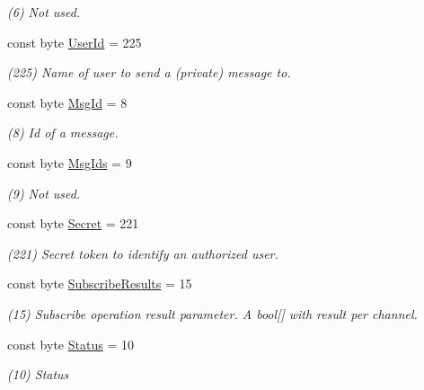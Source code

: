 \begin{DoxyCompactItemize}
\begin{DoxyCompactList}\small\item\em (6) Not used.\end{DoxyCompactList}\item 
const byte \hyperlink{class_exit_games_1_1_client_1_1_photon_1_1_chat_1_1_chat_parameter_code_a4725b80416516202851fced3224ddf10}{User\+Id} = 225
\begin{DoxyCompactList}\small\item\em (225) Name of user to send a (private) message to.\end{DoxyCompactList}\item 
const byte \hyperlink{class_exit_games_1_1_client_1_1_photon_1_1_chat_1_1_chat_parameter_code_a0a54ebe20f51af2268716891be3d6570}{Msg\+Id} = 8
\begin{DoxyCompactList}\small\item\em (8) Id of a message.\end{DoxyCompactList}\item 
const byte \hyperlink{class_exit_games_1_1_client_1_1_photon_1_1_chat_1_1_chat_parameter_code_abc7e73d686ae0713e349611c6ddd7a8e}{Msg\+Ids} = 9
\begin{DoxyCompactList}\small\item\em (9) Not used.\end{DoxyCompactList}\item 
const byte \hyperlink{class_exit_games_1_1_client_1_1_photon_1_1_chat_1_1_chat_parameter_code_aaaeab778bcf9ca4da5add8112086e360}{Secret} = 221
\begin{DoxyCompactList}\small\item\em (221) Secret token to identify an authorized user.\end{DoxyCompactList}\item 
const byte \hyperlink{class_exit_games_1_1_client_1_1_photon_1_1_chat_1_1_chat_parameter_code_a4991d2c2c138a78d8c95be54d1c805da}{Subscribe\+Results} = 15
\begin{DoxyCompactList}\small\item\em (15) Subscribe operation result parameter. A bool\mbox{[}\mbox{]} with result per channel.\end{DoxyCompactList}\item 
const byte \hyperlink{class_exit_games_1_1_client_1_1_photon_1_1_chat_1_1_chat_parameter_code_ac8bd1610fc654ffbd7f37af327116d51}{Status} = 10
\begin{DoxyCompactList}\small\item\em (10) Status\end{DoxyCompactList}\item 

\end{DoxyCompactItemize}
